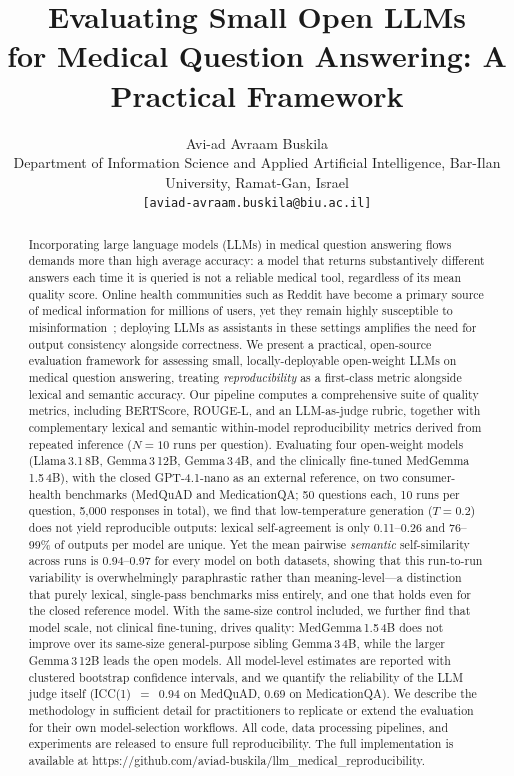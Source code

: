 \documentclass[11pt]{article}
\title{\textbf{Evaluating Small Open LLMs\\
for Medical Question Answering: A Practical Framework}}
\author{
  Avi-ad Avraam Buskila\\
  \small Department of Information Science and Applied Artificial Intelligence, Bar-Ilan University, Ramat-Gan, Israel\\[-2pt]
  \small \texttt{[aviad-avraam.buskila@biu.ac.il]}
}
\date{}
\begin{document}
\doublespacing
\maketitle

\begin{abstract}
Incorporating large language models (LLMs) in medical question answering
flows demands more than high average accuracy: a model that returns
substantively different answers each time it is queried is not a reliable
medical tool, regardless of its mean quality score.
Online health communities such as Reddit have become a primary source of
medical information for millions of users, yet they remain highly
susceptible to misinformation~\cite{suarezlledo2021misinfo, sager2021reddit};
deploying LLMs as assistants in these settings amplifies the need for
output consistency alongside correctness.
We present a practical, open-source evaluation framework for
assessing small, locally-deployable open-weight LLMs on medical
question answering, treating \emph{reproducibility} as a first-class
metric alongside lexical and semantic accuracy.
Our pipeline computes a comprehensive suite of quality metrics, including BERTScore,
ROUGE-L, and an LLM-as-judge rubric, together with complementary
lexical and semantic within-model reproducibility metrics derived
from repeated inference ($N{=}10$ runs per question).
Evaluating four open-weight models (Llama\,3.1\,8B, Gemma\,3\,12B,
Gemma\,3\,4B, and the clinically fine-tuned MedGemma\,1.5\,4B), with the
closed GPT-4.1-nano as an external reference, on two consumer-health
benchmarks (MedQuAD and MedicationQA; 50 questions each, 10 runs per
question, 5{,}000 responses in total), we find that low-temperature
generation ($T{=}0.2$) does not yield reproducible outputs: lexical
self-agreement is only 0.11--0.26 and 76--99\% of outputs per model are
unique. Yet the mean pairwise \emph{semantic} self-similarity across
runs is 0.94--0.97 for every model on both datasets, showing that this
run-to-run variability is overwhelmingly paraphrastic rather than
meaning-level---a distinction that purely lexical, single-pass
benchmarks miss entirely, and one that holds even for the closed
reference model. With the same-size control included, we further find
that model scale, not clinical fine-tuning, drives quality: MedGemma\,1.5\,4B
does not improve over its same-size general-purpose sibling
Gemma\,3\,4B, while the larger Gemma\,3\,12B leads the open models. All
model-level estimates are reported with clustered bootstrap confidence
intervals, and we quantify the reliability of the LLM judge itself
(ICC(1)~$=$~0.94 on MedQuAD, 0.69 on MedicationQA).
We describe the methodology in sufficient detail for practitioners
to replicate or extend the evaluation for their own model-selection
workflows. All code, data processing pipelines, and experiments are 
released to ensure full reproducibility. The full implementation 
is available at 
https://github.com/aviad-buskila/llm\_medical\_reproducibility.
\end{abstract}
\end{document}
